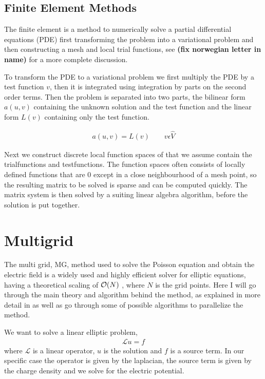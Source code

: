 	\subsection{Finite Element Methods}

		The finite element is a method to numerically solve a partial differential equations (PDE) first transforming the problem into a variational problem and then constructing a mesh and local trial functions, see \cite{alnaes_fenics_2011} \textbf{(fix norwegian letter in name)} for a more complete discussion.

		To transform the PDE to a variational problem we first multiply the PDE by a test function \(v\), then it is integrated using integration by parts on the second order terms. Then the problem is separated into two parts, the bilinear form \(a(u,v)\) containing the unknown solution and the test function and the linear form \(L(v)\) containing only the test function.

		\begin{align}
			a(u,v) = L(v)	\qquad v\epsilon \hat{V}
		\end{align}

		Next we construct discrete local function spaces of that we assume contain the trialfunctions and testfunctions. The function spaces often consists of locally defined functions that are \(0\) except in a close neighbourhood of a mesh point, so the resulting matrix to be solved is sparse and can be computed quickly. The matrix system is then solved by a suiting linear algebra algorithm, before the solution is put together.


\section{Multigrid}
	The multi grid, MG, method used to solve the Poisson equation and obtain the electric field is a widely used and highly efficient solver for elliptic equations, having a theoretical scaling of \(\order{N}\) \citep{press_numerical_1988}, where \(N\) is the grid points. Here I will go through the main theory and algorithm behind the method, as explained in more detail in \citep{press_numerical_1988,trottenberg_multigrid_2000} as well as go through some of possible algorithms to parallelize the method.

	We want to solve a linear elliptic problem,
		\begin{align}
			\mathcal{L} u = f
		\end{align}
	where \(\mathcal{L}\) is a linear operator, \(u\) is the solution and \(f\) is a source term. In our specific case the operator is given by the laplacian, the source term is given by the charge density and we solve for the electric potential.

